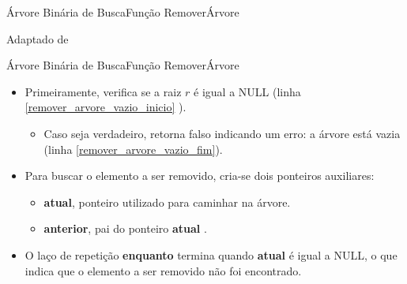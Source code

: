 \documentclass[aspectratio=169]{beamer}
\begin{document}
\begin{frame}{Árvore Binária de Busca}{Função RemoverÁrvore}

\tiny{Adaptado de \cite{Backes2016}}
\end{frame}



\begin{frame}{Árvore Binária de Busca}{Função RemoverÁrvore}
\begin{itemize}
 \item Primeiramente, verifica se a raiz $r$ é igual a NULL (linha \ref{remover_arvore_vazio_inicio} ).
 \begin{itemize}
 \item Caso seja verdadeiro, retorna falso indicando um erro: a árvore está vazia (linha \ref{remover_arvore_vazio_fim}).
 \end{itemize}
 \item Para buscar o elemento a ser removido, cria-se dois ponteiros auxiliares:
 \begin{itemize}
 \item {\bf atual}, ponteiro utilizado para caminhar na árvore. 
 \item {\bf anterior}, pai do ponteiro {\bf atual} .
 \end{itemize}  
 \item O laço de repetição {\bf enquanto} termina quando {\bf atual} é igual a NULL, o que indica que o elemento a ser removido não foi encontrado.
\end{itemize}
\end{frame}
\end{document}
